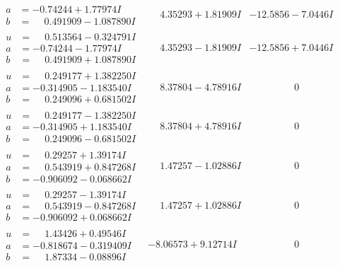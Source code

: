 \documentclass[1p]{elsarticle_modified}
\theoremstyle{definition}
\begin{document}
$$\begin{array}{c|c|c}
\begin{aligned}
a &= -0.74244 + 1.77974 I \\
b &= \phantom{-}0.491909 - 1.087890 I\end{aligned}
 & \phantom{-}4.35293 + 1.81909 I & -12.5856 - 7.0446 I \\ \hline\begin{aligned}
u &= \phantom{-}0.513564 - 0.324791 I \\
a &= -0.74244 - 1.77974 I \\
b &= \phantom{-}0.491909 + 1.087890 I\end{aligned}
 & \phantom{-}4.35293 - 1.81909 I & -12.5856 + 7.0446 I \\ \hline\begin{aligned}
u &= \phantom{-}0.249177 + 1.382250 I \\
a &= -0.314905 - 1.183540 I \\
b &= \phantom{-}0.249096 + 0.681502 I\end{aligned}
 & \phantom{-}8.37804 - 4.78916 I & \phantom{-0.000000 } 0 \\ \hline\begin{aligned}
u &= \phantom{-}0.249177 - 1.382250 I \\
a &= -0.314905 + 1.183540 I \\
b &= \phantom{-}0.249096 - 0.681502 I\end{aligned}
 & \phantom{-}8.37804 + 4.78916 I & \phantom{-0.000000 } 0 \\ \hline\begin{aligned}
u &= \phantom{-}0.29257 + 1.39174 I \\
a &= \phantom{-}0.543919 + 0.847268 I \\
b &= -0.906092 - 0.068662 I\end{aligned}
 & \phantom{-}1.47257 - 1.02886 I & \phantom{-0.000000 } 0 \\ \hline\begin{aligned}
u &= \phantom{-}0.29257 - 1.39174 I \\
a &= \phantom{-}0.543919 - 0.847268 I \\
b &= -0.906092 + 0.068662 I\end{aligned}
 & \phantom{-}1.47257 + 1.02886 I & \phantom{-0.000000 } 0 \\ \hline\begin{aligned}
u &= \phantom{-}1.43426 + 0.49546 I \\
a &= -0.818674 - 0.319409 I \\
b &= \phantom{-}1.87334 - 0.08896 I\end{aligned}
 & -8.06573 + 9.12714 I & \phantom{-0.000000 } 0 \\ \hline\begin{aligned}

\end{aligned}
\end{array}$$
\end{document}
